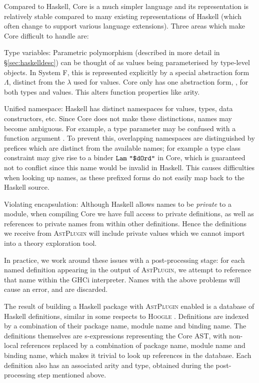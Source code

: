 Compared to Haskell, Core is a much simpler language and its representation is relatively stable compared to many existing representations of Haskell (which often change to support various language extensions). Three areas which make Core difficult to handle are:

\begin{description}
  \item{Type variables}: Parametric polymorphism (described in more detail in \S \ref{sec:haskelldesc}) can be thought of as values being parameterised by type-level objects. In System F, this is represented explicitly by a special abstraction form $\Lambda$, distinct from the $\lambda$ used for values. Core only has one abstraction form, \CLam, for both types and values. This alters function properties like arity.

  \item{Unified namespace}: Haskell has distinct namespaces for values, types, data constructors, etc. Since Core does not make these distinctions, names may become ambiguous. For example, a type parameter  may be confused with a function argument . To prevent this, overlapping namespaces are distinguished by prefices which are distinct from the available names; for example a type class constraint  may give rise to a binder $\texttt{Lam}\ \texttt{"\$dOrd"}$ in Core, which is guaranteed not to conflict since this name would be invalid in Haskell. This causes difficulties when looking up names, as these prefixed forms do not easily map back to the Haskell source.

  \item{Violating encapsulation}: Although Haskell allows names to be \emph{private} to a module, when compiling Core we have full access to private definitions, as well as references to private names from within other definitions. Hence the definitions we receive from \textsc{AstPlugin} will include private values which we cannot import into a theory exploration tool.
\end{description}

In practice, we work around these issues with a post-processing stage: for each named definition appearing in the output of \textsc{AstPlugin}, we attempt to reference that name within the GHCi interpreter. Names with the above problems will cause an error, and are discarded.

The result of building a Haskell package with \textsc{AstPlugin} enabled is a database of Haskell definitions, similar in some respects to \textsc{Hoogle} \cite{mitchell2008hoogle}. Definitions are indexed by a combination of their package name, module name and binding name. The definitions themselves are s-expressions representing the Core AST, with non-local references replaced by a combination of package name, module name and binding name, which makes it trivial to look up references in the database. Each definition also has an associated arity and type, obtained during the post-processing step mentioned above.

